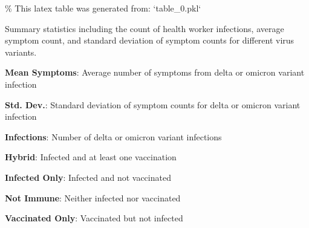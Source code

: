\documentclass[11pt]{article}
\begin{document}
\begin{codeoutput}
\% This latex table was generated from: `table\_0.pkl`
\begin{table}[h]
\caption{Summary statistics of health worker infections by different SARS-CoV-2 variants}
\label{table:summary\_statistics}
\begin{threeparttable}
\renewcommand{\TPTminimum}{\linewidth}
\begin{tablenotes}
\footnotesize
\item Summary statistics including the count of health worker infections, average symptom count, and     standard deviation of symptom counts for different virus variants.
\item \textbf{Mean Symptoms}: Average number of symptoms from delta or omicron variant infection
\item \textbf{Std. Dev.}: Standard deviation of symptom counts for delta or omicron variant infection
\item \textbf{Infections}: Number of delta or omicron variant infections
\item \textbf{Hybrid}: Infected and at least one vaccination
\item \textbf{Infected Only}: Infected and not vaccinated
\item \textbf{Not Immune}: Neither infected nor vaccinated
\item \textbf{Vaccinated Only}: Vaccinated but not infected
\end{tablenotes}
\end{threeparttable}
\end{table}
\end{codeoutput}
\end{document}
